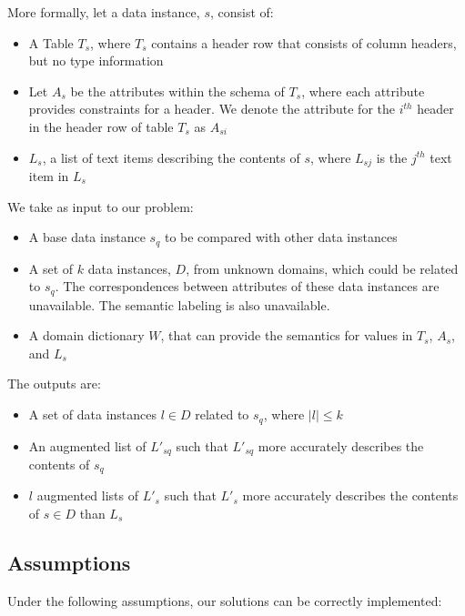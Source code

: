 More formally, let a data instance, $s$, consist of:
\begin{itemize}
\item A Table $T_s$, where $T_s$ contains a header row that consists of column headers, but no type information
\item Let $A_s$ be the attributes within the schema of $T_s$, where each attribute provides constraints for a header. We denote the attribute for the $i^{th}$ header in the header row of table $T_s$ as $A_{si}$
\item $L_s$, a list of text items describing the contents of $s$, where $L_{sj}$ is the $j^{th}$ text item in $L_{s}$
\end{itemize}
We take as input to our problem:
\begin{itemize}
\item A base data instance $s_q$ to be compared with other data instances
\item A set of $k$ data instances, $D$, from unknown domains, which could be related to $s_q$. The correspondences between attributes of these data instances are unavailable. The semantic labeling is also unavailable.
\item A domain dictionary $W$, that can provide the semantics for values in $T_s$, $A_s$, and $L_s$
\end{itemize}
The outputs are:
\begin{itemize}
\item A set of data instances $l\in D$ related to $s_{q}$, where $|l|\le k$
\item An augmented list of $L'_{sq}$ such that $L'_{sq}$ more accurately describes the contents of $s_q$
\item $l$ augmented lists of $L'_s$ such that $L'_s$ more accurately describes the contents of $s\in D$ than $L_s$
\end{itemize}

\subsection{Assumptions}

Under the following assumptions, our solutions can be correctly implemented:

